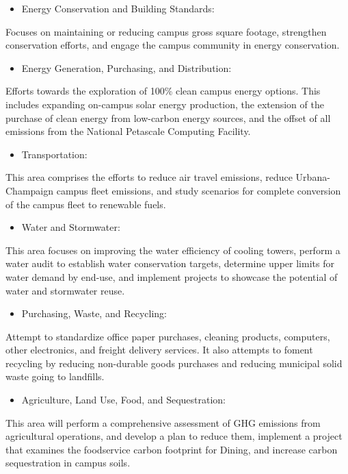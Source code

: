 \documentclass[11pt,letterpaper]{article}
\begin{document}
\begin{itemize}
	\item Energy Conservation and Building Standards:
\end{itemize}
Focuses on maintaining or reducing campus gross square footage, strengthen conservation efforts, and engage the campus community in energy conservation.

\begin{itemize}
	\item Energy Generation, Purchasing, and Distribution:
\end{itemize}
Efforts towards the exploration of 100\% clean campus energy options.
This includes expanding on-campus solar energy production, the extension of the purchase of clean energy from low-carbon energy sources, and the offset of all emissions from the National Petascale Computing Facility.

\begin{itemize}
	\item Transportation:
\end{itemize}
This area comprises the efforts to reduce air travel emissions, reduce Urbana-Champaign campus fleet emissions, and study scenarios for complete conversion of the campus fleet to renewable fuels.

\begin{itemize}
	\item Water and Stormwater:
\end{itemize}
This area focuses on improving the water efficiency of cooling towers, perform a water audit to establish water conservation targets, determine upper limits for water demand by end-use, and implement projects to showcase the potential of water and stormwater reuse.

\begin{itemize}
	\item Purchasing, Waste, and Recycling:
\end{itemize}
Attempt to standardize office paper purchases, cleaning products, computers, other electronics, and freight delivery services.
It also attempts to foment recycling by reducing non-durable goods purchases and reducing municipal solid waste going to landfills.

\begin{itemize}
	\item Agriculture, Land Use, Food, and Sequestration:
\end{itemize}
This area will perform a comprehensive assessment of \gls{GHG} emissions from agricultural operations, and develop a plan to reduce them, implement a project that examines the foodservice carbon footprint for Dining, and increase carbon sequestration in campus soils.
\end{document}
